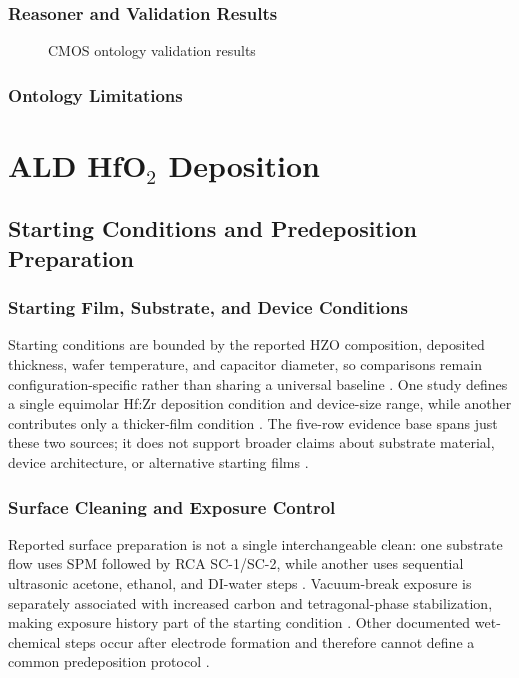 \documentclass[11pt,a4paper]{report}
\begin{document}
\subsection{Reasoner and Validation Results}
\begin{figure}[htbp]
  \centering
  \caption{CMOS ontology validation results}
  \label{fig:cmos-validation}
\end{figure}

\subsection{Ontology Limitations}


\chapter{ALD HfO$_2$ Deposition}
\label{chap:ald}

\section{Starting Conditions and Predeposition Preparation}
\subsection{Starting Film, Substrate, and Device Conditions}

Starting conditions are bounded by the reported HZO composition, deposited thickness, wafer temperature, and capacitor diameter, so comparisons remain configuration-specific rather than sharing a universal baseline \cite{kim2020tin,kim2014inductive}. One study defines a single equimolar Hf:Zr deposition condition and device-size range, while another contributes only a thicker-film condition \cite{kim2020tin,kim2014inductive}. The five-row evidence base spans just these two sources; it does not support broader claims about substrate material, device architecture, or alternative starting films \cite{kim2020tin,kim2014inductive}.
\subsection{Surface Cleaning and Exposure Control}

Reported surface preparation is not a single interchangeable clean: one substrate flow uses SPM followed by RCA SC-1/SC-2, while another uses sequential ultrasonic acetone, ethanol, and DI-water steps \cite{park2022chamber,park2023seed}. Vacuum-break exposure is separately associated with increased carbon and tetragonal-phase stabilization, making exposure history part of the starting condition \cite{schroeder2023road}. Other documented wet-chemical steps occur after electrode formation and therefore cannot define a common predeposition protocol \cite{choi2025purge,kim2020tin,neuber2022peald}.
\end{document}
